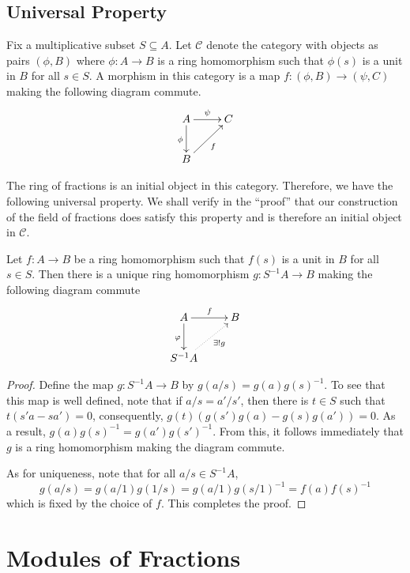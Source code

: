 \subsection{Universal Property}

Fix a multiplicative subset $S\subseteq A$. Let $\mathscr C$ denote the category with objects as pairs $(\phi, B)$ where $\phi: A\to B$ is a ring homomorphism such that $\phi(s)$ is a unit in $B$ for all $s\in S$. A morphism in this category is a map $f:(\phi, B)\to(\psi, C)$ making the following diagram commute.
\begin{equation*}
\xymatrix{
    A\ar[r]^{\psi}\ar[d]_\phi & C\\
    B\ar[ru]_f
}
\end{equation*}

The ring of fractions is an initial object in this category. Therefore, we have the following universal property. We shall verify in the ``proof'' that our construction of the field of fractions does satisfy this property and is therefore an initial object in $\mathscr C$.

\begin{proposition}
    Let $f: A\to B$ be a ring homomorphism such that $f(s)$ is a unit in $B$ for all $s\in S$. Then there is a unique ring homomorphism $g: S^{-1}A\to B$ making the following diagram commute 
    \begin{equation*}
    \xymatrix{
        A\ar[r]^f\ar[d]_\varphi & B\\
        S^{-1}A\ar@{.>}[ru]_-{\exists!g}
    }
    \end{equation*}
\end{proposition}
\begin{proof}
    Define the map $g: S^{-1}A\to B$ by $g(a/s) = g(a)g(s)^{-1}$. To see that this map is well defined, note that if $a/s = a'/s'$, then there is $t\in S$ such that $t(s'a - sa') = 0$, consequently, $g(t)(g(s')g(a) - g(s)g(a')) = 0$. As a result, $g(a)g(s)^{-1} = g(a')g(s')^{-1}$. From this, it follows immediately that $g$ is a ring homomorphism making the diagram commute.

    As for uniqueness, note that for all $a/s\in S^{-1}A$,
    \begin{equation*}
        g(a/s) = g(a/1)g(1/s) = g(a/1)g(s/1)^{-1} = f(a)f(s)^{-1}
    \end{equation*}
    which is fixed by the choice of $f$. This completes the proof.
\end{proof}

\section{Modules of Fractions}

